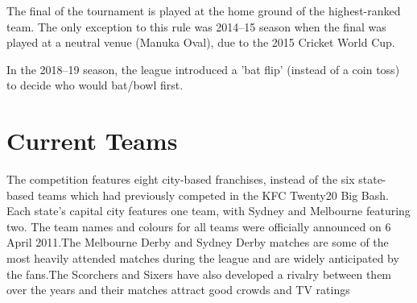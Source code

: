 The final of the tournament is played at the home ground of the highest-ranked team. The only exception to this rule was 2014–15 season when the final was played at a neutral venue (Manuka Oval), due to the 2015 Cricket World Cup.

In the 2018–19 season, the league introduced a 'bat flip' (instead of a coin toss) to decide who would bat/bowl first.
\section{Current Teams}
The competition features eight city-based franchises, instead of the six state-based teams which had previously competed in the KFC Twenty20 Big Bash. Each state's capital city features one team, with Sydney and Melbourne featuring two. The team names and colours for all teams were officially announced on 6 April 2011.The Melbourne Derby and Sydney Derby matches are some of the most heavily attended matches during the league and are widely anticipated by the fans.The Scorchers and Sixers have also developed a rivalry between them over the years and their matches attract good crowds and TV ratings